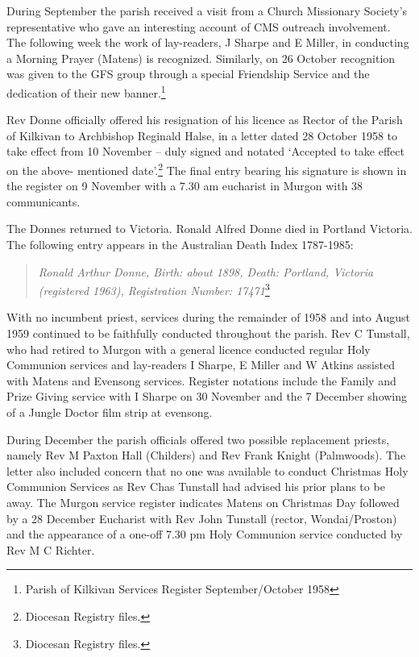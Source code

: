 During September the parish received a visit from a Church Missionary Society's representative who gave an interesting account of CMS outreach involvement. The following week the work of lay-readers, J Sharpe and E Miller, in conducting a Morning Prayer (Matens) is recognized. Similarly, on 26 October recognition was given to the GFS group through a special Friendship Service and the dedication of their new banner.\footnote{Parish of Kilkivan Services Register September/October 1958}

Rev Donne officially offered his resignation of his licence as Rector of the Parish of Kilkivan to Archbishop Reginald Halse, in a letter dated 28 October 1958 to take effect from 10 November -- duly signed and notated `Accepted to take effect on the above- mentioned date'.\footnote{Diocesan Registry files.} The final entry bearing his signature is shown in the register on 9 November with a 7.30 am eucharist in Murgon with 38 communicants.

The Donnes returned to Victoria. Ronald Alfred Donne died in Portland Victoria. The following entry appears in the Australian Death Index 1787-1985:

\begin{quote}
\emph{Ronald Arthur Donne, Birth: about 1898, Death: Portland, Victoria (registered 1963), Registration Number: 17471}\footnote{Diocesan Registry files.}
\end{quote}

With no incumbent priest, services during the remainder of 1958 and into August 1959 continued to be faithfully conducted throughout the parish. Rev C Tunstall, who had retired to Murgon with a general licence conducted regular Holy Communion services and lay-readers I Sharpe, E Miller and W Atkins assisted with Matens and Evensong services. Register notations include the Family and Prize Giving service with I Sharpe on 30 November and the 7 December showing of a Jungle Doctor film strip at evensong.

During December the parish officials offered two possible replacement priests, namely Rev M Paxton Hall (Childers) and Rev Frank Knight (Palmwoods). The letter also included concern that no one was available to conduct Christmas Holy Communion Services as Rev Chas Tunstall had advised his prior plans to be away. The Murgon service register indicates Matens on Christmas Day followed by a 28 December Eucharist with Rev John Tunstall (rector, Wondai/Proston) and the appearance of a one-off 7.30 pm Holy Communion service conducted by Rev M C Richter.

